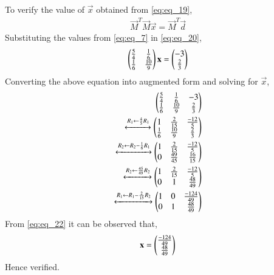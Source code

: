 \documentclass[journal,12pt,twocolumn]{IEEEtran}
\begin{document}
To verify the value of $\vec{x}$ obtained from \eqref{eq:eq_19},
\begin{align} \label{eq:eq_20}
    \vec{M}^T\vec{M}\vec{x} = \vec{M}^T\vec{d}
\end{align}
Substituting the values from \eqref{eq:eq_7} in \eqref{eq:eq_20},
\begin{align}
    \begin{pmatrix}\frac{5}{4} & \frac{1}{6} \\\frac{1}{6} & \frac{10}{9}\end{pmatrix}\mathbf{x} = \begin{pmatrix}-3 \\ \frac{2}{3}\end{pmatrix} \nonumber
\end{align}
Converting the above equation into augmented form and solving for $\vec{x}$,
\begin{align}
    \begin{pmatrix}\frac{5}{4} & \frac{1}{6} & -3\\ \frac{1}{6} & \frac{10}{9} & \frac{2}{3}\end{pmatrix}\nonumber\\ 
    \xleftrightarrow[]{R_1 \leftarrow \frac{4}{5}R_1} 
    \begin{pmatrix}1 & \frac{2}{15} & \frac{-12}{5} \\ \frac{1}{6} & \frac{10}{9} & \frac{2}{3}\end{pmatrix} \nonumber \\ 
    \xleftrightarrow[]{R_2 \leftarrow R_2-\frac{1}{6}R_1} \begin{pmatrix}1 & \frac{2}{15} & \frac{-12}{5} \\ 0 & \frac{49}{45} & \frac{16}{15}\end{pmatrix}\nonumber\\
    \xleftrightarrow[]{R_2 \leftarrow \frac{45}{49}R_2} \begin{pmatrix}1 & \frac{2}{15} & \frac{-12}{5} \\ 0 & 1 & \frac{48}{49}\end{pmatrix}\nonumber\\
    \xleftrightarrow[]{R_1 \leftarrow R_1-\frac{2}{15}R_2} \begin{pmatrix}1 & 0 & \frac{-124}{49} \\ 0 & 1 & \frac{48}{49}\end{pmatrix}\label{eq:eq_22}
\end{align}
From \eqref{eq:eq_22} it can be observed that,
\begin{align} 
    \mathbf{x} = \begin{pmatrix}\frac{-124}{49} \\ \frac{48}{49}\end{pmatrix} 
\end{align}
Hence verified.
\end{document}
